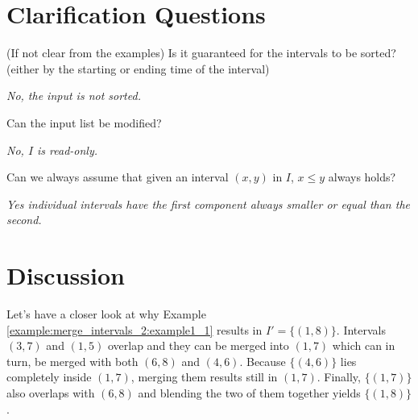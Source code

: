 \section{Clarification Questions}

\begin{QandA}
	\begin{questionitem} \begin{question} (If not clear from the examples) Is it guaranteed for the intervals to be sorted? (either by the starting or ending time of the interval) \end{question} 	 
    \begin{answered}
		\textit{No, the input is not sorted.}
	\end{answered} \end{questionitem}

	\begin{questionitem} \begin{question} Can the input list be modified?\end{question} 	 
    \begin{answered}
		\textit{No, $I$ is read-only.}
	\end{answered} \end{questionitem}

	\begin{questionitem} \begin{question} Can we always assume that given an interval $(x,y)$ in $I$, $ x \leq y$ always holds?\end{question} 	 
		\begin{answered}
			\textit{Yes individual intervals have the first component always smaller or equal than the second.}
		\end{answered} \end{questionitem}
\end{QandA}


\section{Discussion}
\label{example:merge_intervals_2:discussion_1}
Let's have a closer look at why Example \ref{example:merge_intervals_2:example1_1} results in $I'=\{(1,8)\}$.
Intervals $(3,7)$ and $(1,5)$ overlap and they can be merged into $(1,7)$ which can in turn, be merged with both $(6,8)$ and $(4,6)$.
Because $\{(4,6)\}$ lies completely inside $(1,7)$, merging them results still in $(1,7)$.
Finally, $\{(1,7)\}$ also overlaps with $(6,8)$ and blending the two of them together yields $\{(1,8)\}$.


